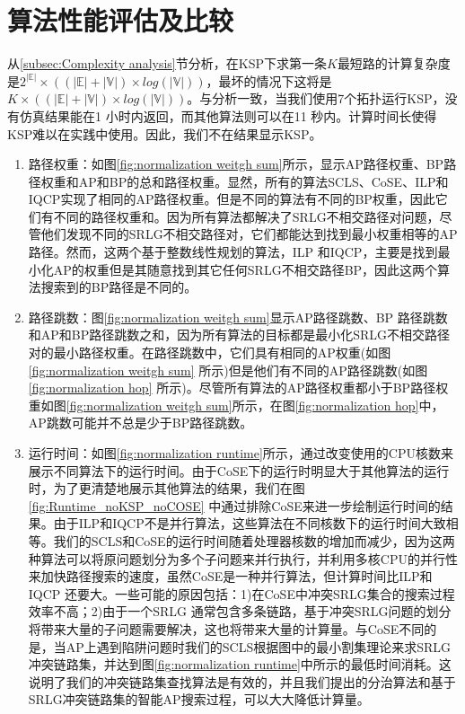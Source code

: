 \section{算法性能评估及比较}
从\ref{subsec:Complexity analysis}节分析，在KSP下求第一条$K$最短路的计算复杂度是$2^{|\mathbb{E}|}\times ((|\mathbb{E}|+|\mathbb{V}|)\times log(|\mathbb{V}|))$，最坏的情况下这将是$K\times ((|\mathbb{E}|+|\mathbb{V}|)\times log(|\mathbb{V}|))$。与分析一致，当我们使用7个拓扑运行KSP，没有仿真结果能在1 小时内返回，而其他算法则可以在11 秒内。计算时间长使得KSP难以在实践中使用。因此，我们不在结果显示KSP。
\begin{enumerate}
  \item 路径权重：如图\ref{fig:normalization weitgh sum}所示，显示AP路径权重、BP路径权重和AP和BP的总和路径权重。显然，所有的算法SCLS、CoSE、ILP和IQCP实现了相同的AP路径权重。但是不同的算法有不同的BP权重，因此它们有不同的路径权重和。因为所有算法都解决了SRLG不相交路径对问题，尽管他们发现不同的SRLG不相交路径对，它们都能达到找到最小权重相等的AP路径。然而，这两个基于整数线性规划的算法，ILP 和IQCP，主要是找到最小化AP的权重但是其随意找到其它任何SRLG不相交路径BP，因此这两个算法搜索到的BP路径是不同的。
  \item 路径跳数：图\ref{fig:normalization weitgh sum}显示AP路径跳数、BP 路径跳数和AP和BP路径跳数之和，因为所有算法的目标都是最小化SRLG不相交路径对的最小路径权重。在路径跳数中，它们具有相同的AP权重(如图\ref{fig:normalization weitgh sum} 所示)但是他们有不同的AP路径跳数(如图\ref{fig:normalization hop} 所示)。尽管所有算法的AP路径权重都小于BP路径权重如图\ref{fig:normalization weitgh sum}所示，在图\ref{fig:normalization hop}中，AP跳数可能并不总是少于BP路径跳数。
  \item 运行时间：如图\ref{fig:normalization runtime}所示，通过改变使用的CPU核数来展示不同算法下的运行时间。由于CoSE下的运行时明显大于其他算法的运行时，为了更清楚地展示其他算法的结果，我们在图\ref{fig:Runtime_noKSP_noCOSE} 中通过排除CoSE来进一步绘制运行时间的结果。由于ILP和IQCP不是并行算法，这些算法在不同核数下的运行时间大致相等。我们的SCLS和CoSE的运行时间随着处理器核数的增加而减少，因为这两种算法可以将原问题划分为多个子问题来并行执行，并利用多核CPU的并行性来加快路径搜索的速度，虽然CoSE是一种并行算法，但计算时间比ILP和IQCP 还要大。一些可能的原因包括：1)在CoSE中冲突SRLG集合的搜索过程效率不高；2)由于一个SRLG 通常包含多条链路，基于冲突SRLG问题的划分将带来大量的子问题需要解决，这也将带来大量的计算量。与CoSE不同的是，当AP上遇到陷阱问题时我们的SCLS根据图中的最小割集理论来求SRLG冲突链路集，并达到图\ref{fig:normalization runtime}中所示的最低时间消耗。这说明了我们的冲突链路集查找算法是有效的，并且我们提出的分治算法和基于SRLG冲突链路集的智能AP搜索过程，可以大大降低计算量。

\end{enumerate}

